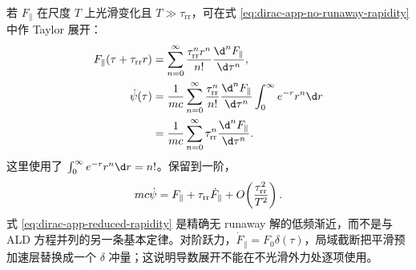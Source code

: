 若 $F_\parallel$ 在尺度 $T$ 上光滑变化且 $T\gg\tau_{\mathrm{rr}}$，可在式 \eqref{eq:dirac-app-no-runaway-rapidity} 中作 Taylor 展开：
\begin{align}
 F_\parallel(\tau+\tau_{\mathrm{rr}}r)
 &=\sum_{n=0}^\infty
 {\tau_{\mathrm{rr}}^nr^n\over n!}
 {\d^nF_\parallel\over\d\tau^n},
 \notag\\
 \dot\psi(\tau)
 &= {1\over mc}
 \sum_{n=0}^\infty
 {\tau_{\mathrm{rr}}^n\over n!}
 {\d^nF_\parallel\over\d\tau^n}
 \int_0^\infty e^{-r}r^n\d r
 \notag\\
 &= {1\over mc}
 \sum_{n=0}^\infty
 \tau_{\mathrm{rr}}^n
 {\d^nF_\parallel\over\d\tau^n}.
 \label{eq:dirac-app-derivative-expansion}
\end{align}
这里使用了 $\int_0^\infty e^{-r}r^n\d r=n!$。保留到一阶，
\begin{equation}
 mc\dot\psi
 =F_\parallel+\tau_{\mathrm{rr}}\dot F_\parallel
 +O\!\left({\tau_{\mathrm{rr}}^2\over T^2}\right).
 \label{eq:dirac-app-reduced-rapidity}
\end{equation}
式 \eqref{eq:dirac-app-reduced-rapidity} 是精确无 runaway 解的低频渐近，而不是与 ALD 方程并列的另一条基本定律。对阶跃力，$\dot F_\parallel=F_0\delta(\tau)$，局域截断把平滑预加速层替换成一个 $\delta$ 冲量；这说明导数展开不能在不光滑外力处逐项使用。

